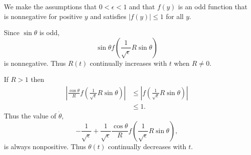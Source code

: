 \begin{Solution}
  We make the assumptions that $0 < \epsilon < 1$ and that $f(y)$ 
  is an odd function that is nonnegative for positive $y$ and 
  satisfies $|f(y)| \leq 1$ for all $y$.

  Since $\sin\theta$ is odd,
  \[ \sin\theta f\left(\frac{1}{\sqrt{\epsilon}} R \sin\theta \right) \]
  is nonnegative.  Thus $R(t)$ continually increases with $t$ when $R \neq 0$.

  If $R > 1$ then
  \begin{align*}
    \left|\frac{\cos\theta}{R} f\left(\frac{1}{\sqrt{\epsilon}} R \sin\theta 
      \right)\right|
    &\leq \left|f\left(\frac{1}{\sqrt{\epsilon}} R \sin\theta 
      \right)\right| \\
    &\leq 1.
  \end{align*}
  Thus the value of $\dot{\theta}$,
  \[ - \frac{1}{\sqrt{\epsilon}} + \frac{1}{\sqrt{\epsilon}}\frac{\cos\theta}{R}
  f\left(\frac{1}{\sqrt{\epsilon}} R \sin\theta \right), \]
  is always nonpositive.  Thus $\theta(t)$ continually decreases with $t$.
\end{Solution}



